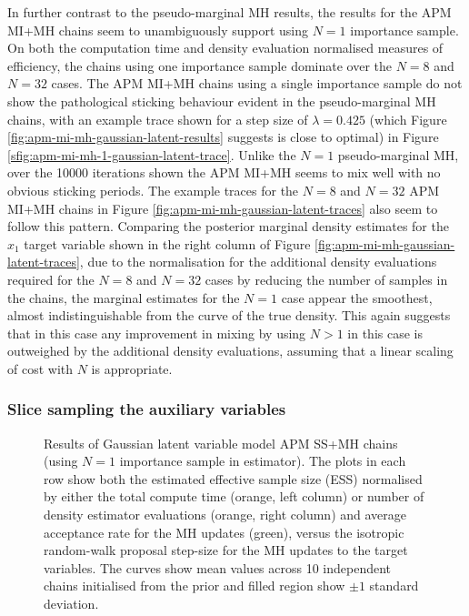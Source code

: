 In further contrast to the pseudo-marginal \ac{MH} results, the results for the \ac{APM} \ac{MI}+\ac{MH} chains seem to unambiguously support using $N=1$ importance sample. On both the computation time and density evaluation normalised measures of efficiency, the chains using one importance sample dominate over the $N=8$ and $N=32$ cases. The \ac{APM} \ac{MI}+\ac{MH} chains using a single importance sample do not show the pathological sticking behaviour evident in the pseudo-marginal \ac{MH} chains, with an example trace shown for a step size of $\lambda = 0.425$ (which Figure \ref{fig:apm-mi-mh-gaussian-latent-results} suggests is close to optimal) in Figure \ref{sfig:apm-mi-mh-1-gaussian-latent-trace}. Unlike the $N=1$ pseudo-marginal \ac{MH}, over the 10000 iterations shown the \ac{APM} \ac{MI}+\ac{MH} seems to mix well with no obvious sticking periods. The example traces for the $N=8$ and $N=32$ \ac{APM} \ac{MI}+\ac{MH} chains in Figure \ref{fig:apm-mi-mh-gaussian-latent-traces} also seem to follow this pattern. Comparing the posterior marginal density estimates for the $x_1$ target variable shown in the right column of Figure \ref{fig:apm-mi-mh-gaussian-latent-traces}, due to the normalisation for the additional density evaluations required for the $N=8$ and $N=32$ cases by reducing the number of samples in the chains, the marginal estimates for the $N=1$ case appear the smoothest, almost indistinguishable from the curve of the true density. This again suggests that in this case any improvement in mixing by using $N > 1$ in this case is outweighed by the additional density evaluations, assuming that a linear scaling of cost with $N$ is appropriate.

\subsubsection{Slice sampling the auxiliary variables}

\begin{figure}[t]
\centering
\caption[\acs{APM} \acs{SS}+\acs{MH} Gaussian model results.]{
Results of Gaussian latent variable model \acs{APM} \acs{SS}+\acs{MH} chains (using $N=1$ importance sample in estimator). The plots in each row show both the estimated effective sample size (ESS) normalised by either the total compute time (orange, left column) or number of density estimator evaluations (orange, right column) and average acceptance rate for the \ac{MH} updates (green), versus the isotropic random-walk proposal step-size for the \ac{MH} updates to the target variables. The curves show mean values across 10 independent chains initialised from the prior and filled region show $\pm 1$ standard deviation.}
\label{fig:apm-ss-mh-gaussian-latent-results}
\end{figure}

